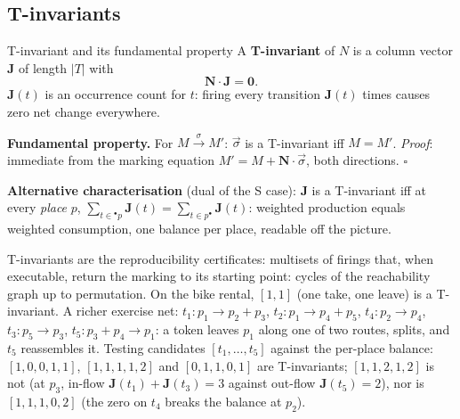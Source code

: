 \subsection{T-invariants}

\begin{definitionbox}{T-invariant and its fundamental property}
A \textbf{T-invariant} of $N$ is a column vector $\mathbf{J}$ of length $|T|$ with
\[
  \mathbf{N} \cdot \mathbf{J} = \mathbf{0}.
\]
$\mathbf{J}(t)$ is an occurrence count for $t$: firing every transition $\mathbf{J}(t)$ times causes zero net change everywhere.
\par\smallskip
\textbf{Fundamental property.} For $M \xrightarrow{\sigma} M'$: $\vec{\sigma}$ is a T-invariant iff $M = M'$. \textit{Proof}: immediate from the marking equation $M' = M + \mathbf{N} \cdot \vec{\sigma}$, both directions. \hfill$\square$
\par\smallskip
\textbf{Alternative characterisation} (dual of the S case): $\mathbf{J}$ is a T-invariant iff at every \emph{place} $p$, $\sum_{t \in {}^\bullet p} \mathbf{J}(t) = \sum_{t \in p^\bullet} \mathbf{J}(t)$: weighted production equals weighted consumption, one balance per place, readable off the picture.
\end{definitionbox}

T-invariants are the reproducibility certificates: multisets of firings that, when executable, return the marking to its starting point: cycles of the reachability graph up to permutation. On the bike rental, $[1,1]$ (one \textsf{take}, one \textsf{leave}) is a T-invariant. A richer exercise net: $t_1 : p_1 \to p_2 + p_3$, $t_2 : p_1 \to p_4 + p_5$, $t_4 : p_2 \to p_4$, $t_3 : p_5 \to p_3$, $t_5 : p_3 + p_4 \to p_1$: a token leaves $p_1$ along one of two routes, splits, and $t_5$ reassembles it. Testing candidates $[t_1, \ldots, t_5]$ against the per-place balance: $[1,0,0,1,1]$, $[1,1,1,1,2]$ and $[0,1,1,0,1]$ are T-invariants; $[1,1,2,1,2]$ is not (at $p_3$, in-flow $\mathbf{J}(t_1) + \mathbf{J}(t_3) = 3$ against out-flow $\mathbf{J}(t_5) = 2$), nor is $[1,1,1,0,2]$ (the zero on $t_4$ breaks the balance at $p_2$).

